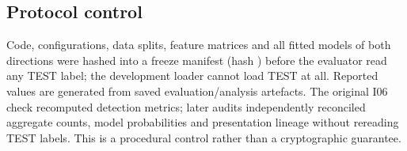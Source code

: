 \subsection{Protocol control}
Code, configurations, data splits, feature matrices and all fitted models of both directions were hashed into a freeze manifest (hash \texttt{}) before the evaluator read any TEST label; the development loader cannot load TEST at all. Reported values are generated from saved evaluation/analysis artefacts. The original I06 check recomputed detection metrics; later audits independently reconciled aggregate counts, model probabilities and presentation lineage without rereading TEST labels. This is a procedural control rather than a cryptographic guarantee.
